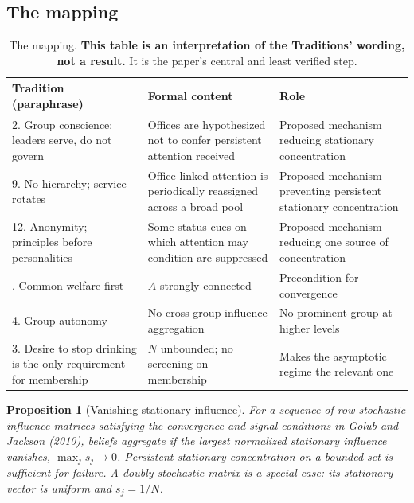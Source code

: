 \documentclass[11pt,a4paper]{article}
\newtheorem{proposition}{Proposition}
\begin{document}
\subsection{The mapping}

\begin{table}[htbp]\centering\small
\begin{tabular}{@{}p{}p{}p{}@{}}
\toprule
\textbf{Tradition (paraphrase)} & \textbf{Formal content} & \textbf{Role} \\
\midrule
2. Group conscience; leaders serve, do not govern & Offices are hypothesized not to confer persistent attention received & Proposed mechanism reducing stationary concentration \\
9. No hierarchy; service rotates & Office-linked attention is periodically reassigned across a broad pool & Proposed mechanism preventing persistent stationary concentration \\
12. Anonymity; principles before personalities & Some status cues on which attention may condition are suppressed & Proposed mechanism reducing one source of concentration \\
\addlinespace
1. Common welfare first & $A$ strongly connected & Precondition for convergence \\
4. Group autonomy & No cross-group influence aggregation & No prominent group at higher levels \\
3. Desire to stop drinking is the only requirement for membership & $N$ unbounded; no screening on membership & Makes the asymptotic regime the relevant one \\
\bottomrule
\end{tabular}
\caption{The mapping. \textbf{This table is an interpretation of the Traditions'
wording, not a result.} It is the paper's central and least verified step.}
\label{tab:mapping}
\end{table}

\begin{proposition}[Vanishing stationary influence]
\label{prop:one}
For a sequence of row-stochastic influence matrices satisfying the convergence
and signal conditions in Golub and Jackson (2010), beliefs aggregate if the
largest normalized stationary influence vanishes, $\max_j s_j\to0$. Persistent
stationary concentration on a bounded set is sufficient for failure. A doubly
stochastic matrix is a special case: its stationary vector is uniform and
$s_j=1/N$.
\end{proposition}
\end{document}
